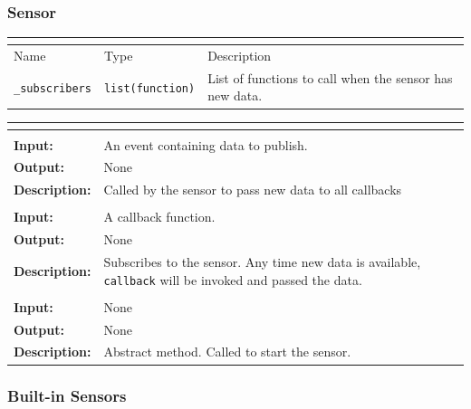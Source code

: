 \documentclass[titlepage]{article}
\newcommand{\operations}[1]{
\begin{center}
    \begin{longtable}{|p{4cm}|p{10cm + 2.0\tabcolsep}|}
    \hline
    \multicolumn{2}{|l|}{\cellcolor[gray]{0.5}{\textbf{Operations}}} \\ \hline
#1
    \end{longtable}
\end{center}
}
\newcommand{\operation}[4]{
    \hline
    \multicolumn{2}{|l|}{\cellcolor[gray]{0.8}{\texttt{#1}}} \\ \hline
    \hspace{7pt}\textbf{Input:} & #2 \\ \hline
    \hspace{7pt}\textbf{Output:} & #3 \\ \hline
    \hspace{7pt}\textbf{Description:} & #4 \\ \hline
}
\newcommand{\attributes}[1]{
    \begin{center}
        \begin{tabular}{|p{3cm}|p{3cm}|p{8cm}|}
            \multicolumn{3}{|l|}{\cellcolor[gray]{0.5}{\textbf{Attributes}}} \\ \hline
            \rowcolor[gray]{0.8} Name & Type & Description \\ \hline 
            #1
        \end{tabular}
    \end{center}
}
\newcommand{\attribute}[3]{
    \texttt{#1} & \texttt{#2} & #3 \\ \hline
}
\begin{document}
\subsubsection{Sensor}
\attributes
{
    \attribute{\_subscribers}{list(function)}{List of functions to call when the sensor has new data.}
}

\operations
{
    \operation{\_publish\_data(event)}{An event containing data to publish.}{None}{Called by the sensor to pass new data to all callbacks}
    \operation{subscribe(callback)}{A callback function.}{None}{Subscribes to the sensor.  Any time new data is available, \texttt{callback} will be invoked and passed the data.}
    \operation{run()}{None}{None}{Abstract method.  Called to start the sensor.}
}

\subsubsection{Built-in Sensors}
\end{document}
